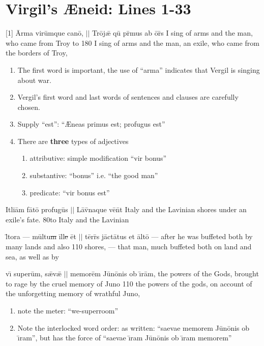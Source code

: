 \section{Virgil's {\AE}neid:  Lines 1-33} %



\latline
  {[1] \={\macron A}rm\-a v\-ir\=umqu\-e c\-an{\={\macron o}}, $||$ Tr\={o}j\={\ae} qu\={\macron{\i}} pr\={\macron{\i}}m\-us \-ab \={o}r\={\macron{\i}}s}
	{I sing of arms and the man, who came from Troy to}
  {180}
	{I sing of arms and the man, an exile, who came from the borders of Troy,}
	{
	\begin{enumerate}
			\item The first word is important, the use of ``arma'' indicates that Vergil is singing about war.
			\item Vergil's first word and last words of sentences and clauses are carefully chosen.
			\item Supply ``est'':  ``{\AE}neas primus est; profugus est''
			\item There are \textbf{three} types of adjectives
			\begin{enumerate}
				\item attributive: simple modification ``vir bonus''
				\item substantive:  ``bonus'' i.e. ``the good man''
				\item predicate:  ``vir bonus est''
			\end{enumerate}
		 \end{enumerate}	
	}

\latline
		{{\macron I}tl\-i\={a}m f\={\macron a}t\={\macron o} pr\-of\-ug\={\macron u}s $||$ L\={\macron a}v\={\macron{\i}}n\-aqu\-e v\={\macron e}n\={\macron{\i}}t}
		{Italy and the Lavinian shores under an exile's fate.}
		{80}{to Italy and the Lavinian }{}

\newpage
\latline
{l\={\macron{\i}}t\-or\-a --- m\=ultu\sout{m }\={i}ll\={{\sout{e }}\=e}t $||$ t\=err\={\macron{\i}}s j\=act\={\macron a}t\-us \-et \=alt\={\macron o}}
{--- after he was buffeted both by many lands and also}
{110}
{shores, --- that man, much buffeted both on land and sea, as well as by}
{}


\latline
{v\={\i} s\-up\-er\=um, s\={\ae}v\={\ae} $||$ m\-em\-or\=em J\={u}n\={o}n\-is \-ob \={\i}r\=am,}
{the powers of the Gods, brought to rage by the cruel memory of Juno}
{110}
{the powers of the gods, on account of the unforgetting memory of wrathful Juno,}
{
	\begin{enumerate}
		\item note the meter:  ``we-superroom''
		\item Note the interlocked word order:  as written: ``saevae memorem J\={u}n\={o}nis ob {\={\i}}ram'',
		but has the force of  ``saevae {\={\i}}ram J\={u}n\={o}nis ob \={\i}ram memorem''
	\end{enumerate}
}

